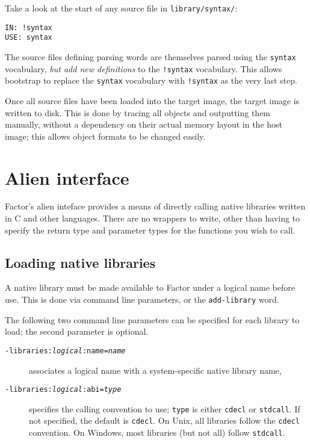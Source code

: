 \documentclass{book}
\begin{document}
Take a look at the start of any source file in \verb|library/syntax/|:

\begin{verbatim}
IN: !syntax
USE: syntax
\end{verbatim}

The source files defining parsing words are themselves parsed using the \verb|syntax| vocabulary, \emph{but add new definitions} to the \verb|!syntax| vocabulary. This allows bootstrap to replace the \verb|syntax| vocabulary with \verb|!syntax| as the very last step.

Once all source files have been loaded into the target image, the target image is written to disk. This is done by tracing all objects and outputting them manually, without a dependency on their actual memory layout in the host image; this allows object formats to be changed easily.

\chapter{Alien interface}

Factor's alien inteface provides a means of directly calling native libraries written in C and other languages. There are no
wrappers to write, other than having to specify the return type and parameter types for
the functions you wish to call.

\section{Loading native libraries}\label{native-libs}

A native library must be made available to Factor under a logical name before use. This is done via command line parameters, or the \verb|add-library| word.

The following two command line parameters can be specified for each library to load; the second parameter is optional.
\begin{description}
\item[\texttt{-libraries:\emph{logical}:name=\emph{name}}] associates a logical name with a system-specific native library name,
\item[\texttt{-libraries:\emph{logical}:abi=\emph{type}}] specifies the calling convention to use; \verb|type| is either \verb|cdecl| or \verb|stdcall|. If not specified, the default is \verb|cdecl|. On Unix, all libraries follow the \verb|cdecl| convention. On Windows, most libraries (but not all) follow \verb|stdcall|.
\end{description}
\end{document}
